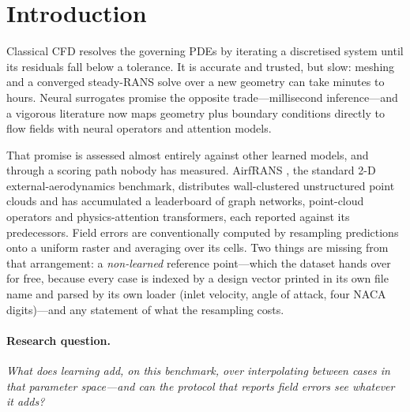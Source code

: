 \section{Introduction}

Classical CFD resolves the governing PDEs by iterating a discretised system until its
residuals fall below a tolerance. It is accurate and trusted, but slow: meshing and a
converged steady-RANS solve over a new geometry can take minutes to hours. Neural
surrogates promise the opposite trade---millisecond inference---and a vigorous
literature now maps geometry plus boundary conditions directly to flow fields with
neural operators and attention models.

That promise is assessed almost entirely against other learned models, and through a
scoring path nobody has measured. AirfRANS \citep{bonnet2022airfrans}, the standard 2-D
external-aerodynamics benchmark, distributes wall-clustered unstructured point clouds and
has accumulated a leaderboard of graph networks, point-cloud operators and
physics-attention transformers, each reported against its predecessors. Field errors are
conventionally computed by resampling predictions onto a uniform raster and averaging over
its cells. Two things are missing from that arrangement: a \emph{non-learned} reference
point---which the dataset hands over for free, because every case is indexed by a design
vector printed in its own file name and parsed by its own loader (inlet velocity, angle of
attack, four NACA digits)---and any statement of what the resampling costs.

\paragraph{Research question.} \emph{What does learning add, on this benchmark, over
interpolating between cases in that parameter space---and can the protocol that reports
field errors see whatever it adds?}

